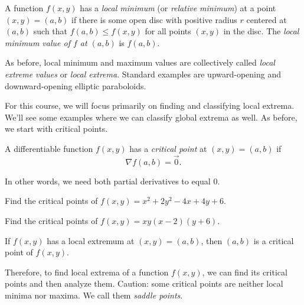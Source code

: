 \begin{defn}
    A function $f(x,y)$ has a \emph{local minimum} (or \emph{relative minimum}) at a point $(x,y)=(a,b)$ if there is some open disc with positive radius $r$ centered at $(a,b)$ such that $f(a,b)\le f(x,y)$ for all points $(x,y)$ in the disc. The \emph{local minimum value of $f$ at $(a,b)$} is $f(a,b)$.
\end{defn}

\noindent As before, local minimum and maximum values are collectively called \emph{local extreme values} or \emph{local extrema}. Standard examples are upward-opening and downward-opening elliptic paraboloids.

\vspace{1in}

For this course, we will focus primarily on finding and classifying local extrema. We'll see some examples where we can classify global extrema as well. As before, we start with critical points.

\begin{defn}
    A differentiable function $f(x,y)$ has a \emph{critical point} at $(x,y)=(a,b)$ if 
    \[
        \nabla f(a,b)=\vec{0}.
    \]
\end{defn}
\noindent In other words, we need both partial derivatives to equal 0.

\pagebreak 

\begin{ex}\label{ex:find-crit-pts-1}
    Find the critical points of $f(x,y)=x^2+2y^2-4x+4y+6$.
\end{ex} 

\vspace{2in}

\begin{ex}\label{ex:find-crit-pts-2}
    Find the critical points of $f(x,y)=xy(x-2)(y+6)$.
\end{ex}

\vfill

\pagebreak 

\begin{prop}
    If $f(x,y)$ has a local extremum at $(x,y)=(a,b)$, then $(a,b)$ is a critical point of $f(x,y)$.
\end{prop}

Therefore, to find local extrema of a function $f(x,y)$, we can find its critical points and then analyze them. Caution: some critical points are neither local minima nor maxima. We call them \emph{saddle points}.
\vspace{1in}

